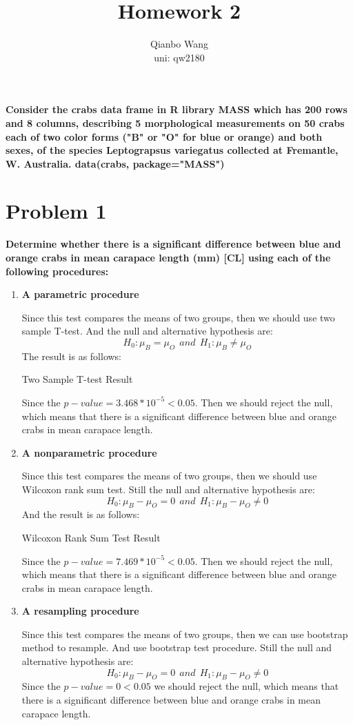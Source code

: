 \documentclass[10pt,letterpaper]{article}
\title{\textbf {Homework 2}}
\author{{Qianbo Wang}\\{uni: qw2180}}
\date{}
\begin{document}
\maketitle
\thispagestyle{fancy}
\vspace{-2em}

\textbf{Consider the crabs data frame in R library MASS which has 200 rows and 8 columns, describing 5 morphological measurements on 50 crabs each of two color forms ("B" or "O" for blue or orange) and both sexes, of the species Leptograpsus variegatus collected at Fremantle, W. Australia. data(crabs, package="MASS")}
\section*{Problem 1}
\textbf{Determine whether there is a significant difference between blue and orange crabs in mean carapace length (mm) [CL] using each of the following procedures:}
\begin{enumerate}[leftmargin=0cm,itemindent=.5cm,labelwidth=\itemindent,labelsep=0cm,align=left]
\item[\textbullet] \textbf{A parametric procedure}

Since this test compares the means of two groups, then we should use two sample T-test. And the null and alternative hypothesis are:
$$H_0: \mu_B=\mu_O ~~and~~H_1: \mu_B\neq \mu_O$$
The result is as follows:
\begin{center}
Two Sample T-test Result

\end{center}
Since the $p-value=3.468*10^{-5}<0.05$. Then we should reject the null, which means that there is a significant difference between blue and orange crabs in mean carapace length. 

\item[\textbullet] \textbf{A nonparametric procedure}

Since this test compares the means of two groups, then we should use Wilcoxon rank sum test. Still the null and alternative hypothesis are:
\[H_0: \mu_B-\mu_O=0 ~~and~~H_1: \mu_B-\mu_O\neq 0\]
And the result is as follows:
\begin{center}
Wilcoxon Rank Sum Test Result

\end{center}
Since the $p-value=7.469*10^{-5}<0.05$. Then we should reject the null, which means that there is a significant difference between blue and orange crabs in mean carapace length. 

\item[\textbullet] \textbf{A resampling procedure}

Since this test compares the means of two groups, then we can use bootstrap method to resample. And use bootstrap test procedure. Still the null and alternative hypothesis are:
\[H_0: \mu_B-\mu_O=0 ~~and~~H_1: \mu_B-\mu_O\neq 0\]
Since the $p-value=0<0.05$ we should reject the null, which means that there is a significant difference between blue and orange crabs in mean carapace length. 
\end{enumerate}
\end{document}
